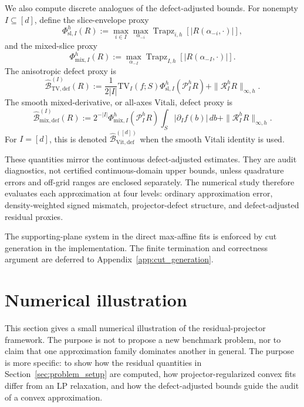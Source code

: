 \documentclass[11pt,letterpaper]{article}
\theoremstyle{definition}
\theoremstyle{remark}
\newcommand{\TV}{\mathrm{TV}}
\newcommand{\Def}{\mathrm{def}}
\begin{document}
We also compute discrete analogues of the defect-adjusted bounds. For nonempty
$I\subseteq[d]$, define the slice-envelope proxy
$$
\Phi_{\mathrm{sl},I}^h(R)
:=
\max_{i\in I}
\max_{\alpha_{-i}}
\operatorname{Trapz}_{i,h}
\left[
|R(\alpha_{-i},\cdot)|
\right],
$$
and the mixed-slice proxy
$$
\Phi_{\mathrm{mix},I}^h(R)
:=
\max_{\alpha_{-I}}
\operatorname{Trapz}_{I,h}
\left[
|R(\alpha_{-I},\cdot)|
\right].
$$
The anisotropic defect proxy is
$$
\widehat{\mathcal B}_{\mathrm{TV},\Def}^{(I)}(R)
:=
\frac{1}{2|I|}
\TV_I(f;S)
\Phi_{\mathrm{sl},I}^h(\mathcal P_I^hR)
+
\|\mathcal R_I^hR\|_{\infty,h}.
$$
The smooth mixed-derivative, or all-axes Vitali, defect proxy is
$$
\widehat{\mathcal B}_{\mathrm{mix},\Def}^{(I)}(R)
:=
2^{-|I|}
\Phi_{\mathrm{mix},I}^h(\mathcal P_I^hR)
\int_S|\partial_I f(b)|\,db
+
\|\mathcal R_I^hR\|_{\infty,h}.
$$
For $I=[d]$, this is denoted
$\widehat{\mathcal B}_{\mathrm{Vit},\Def}^{([d])}$ when the smooth Vitali
identity is used.

These quantities mirror the continuous defect-adjusted estimates. They are
audit diagnostics, not certified continuous-domain upper bounds, unless
quadrature errors and off-grid ranges are enclosed separately. The numerical
study therefore evaluates each approximation at four levels: ordinary
approximation error, density-weighted signed mismatch, projector-defect
structure, and defect-adjusted residual proxies.

The supporting-plane system in the direct max-affine fits is enforced by cut
generation in the implementation. The finite termination and correctness
argument are deferred to Appendix~\ref{app:cut_generation}.


\section{Numerical illustration}
\label{sec:numerics}
 

This section gives a small numerical illustration of the residual-projector
framework. The purpose is not to propose a new benchmark problem, nor to claim
that one approximation family dominates another in general. The purpose is
more specific: to show how the residual quantities in
Section~\ref{sec:problem_setup} are computed, how projector-regularized convex
fits differ from an LP relaxation, and how the defect-adjusted bounds guide the
audit of a convex approximation.
\end{document}
